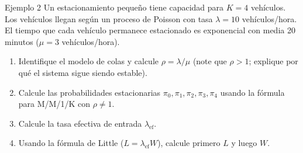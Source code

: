 \documentclass[aspectratio=1610, 10pt]{beamer}
\begin{document}
\begin{frame}{Ejemplo 2}
Un estacionamiento pequeño tiene capacidad para $K = 4$ vehículos. Los vehículos llegan según un proceso de Poisson con tasa $\lambda = 10$ vehículos/hora. El tiempo que cada vehículo permanece estacionado es exponencial con media 20 minutos ($\mu = 3$ vehículos/hora).

\begin{enumerate}
    \item Identifique el modelo de colas y calcule $\rho = \lambda/\mu$ (note que $\rho > 1$; explique por qué el sistema sigue siendo estable).
    \item Calcule las probabilidades estacionarias $\pi_0, \pi_1, \pi_2, \pi_3, \pi_4$ usando la fórmula para M/M/1/K con $\rho \neq 1$.
    \item Calcule la tasa efectiva de entrada $\lambda_{\text{ef}}$.
    \item Usando la fórmula de Little ($L = \lambda_{\text{ef}} W$), calcule primero $L$ y luego $W$.
\end{enumerate}

\end{frame}
\end{document}

